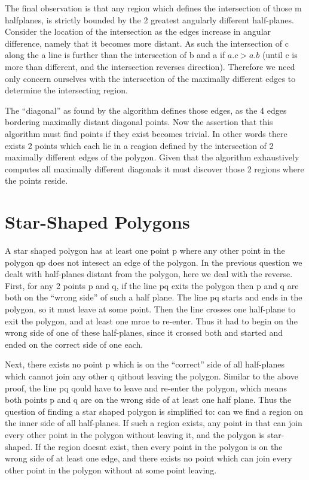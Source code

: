 The final observation is that any region which defines the intersection of those m halfplanes, is strictly bounded by the 2 greatest angularly different half-planes.
Consider the location of the intersection as the edges increase in angular difference, namely that it becomes more distant.
As such the intersection of c along the a line is further than the intersection of b and a if $a.c > a.b$ (until c is more than \pi different, and the intersection reverses direction).
Therefore we need only concern ourselves with the intersection of the maximally different edges to determine the intersecting region.

The ``diagonal'' as found by the algorithm defines those edges, as the 4 edges bordering maximally distant diagonal points.
Now the assertion that this algorithm must find points if they exist becomes trivial.
In other words there exists 2 points which each lie in a reagion defined by the intersection of 2 maximally different edges of the polygon.
Given that the algorithm exhaustively computes all maximally different diagonals it must discover those 2 regions where the points reside.

\section {Star-Shaped Polygons}

A star shaped polygon has at least one point p where any other point in the polygon qp does not intesect an edge of the polygon.
In the previous question we dealt with half-planes distant from the polygon, here we deal with the reverse.
First, for any 2 points p and q, if the line pq exits the polygon then p and q are both on the ``wrong side'' of such a half plane.
The line pq starts and ends in the polygon, so it must leave at some point.
Then the line crosses one half-plane to exit the polygon, and at least one mroe to re-enter.
Thus it had to begin on the wrong side of one of these half-planes, since it crossed both and started and ended on the correct side of one each.

Next, there exists no point p which is on the ``correct'' side of all half-planes which cannot join any other q qithout leaving the polygon.
Similar to the above proof, the line pq qould have to leave and re-enter the polygon, which means both points p and q are on the wrong side of at least one half plane.
Thus the question of finding a star shaped polygon is simplified to: can we find a region on the inner side of all half-planes.
If such a region exists, any point in that can join every other point in the polygon without leaving it, and the polygon is star-shaped.
If the region doesnt exist, then every point in the polygon is on the wrong side of at least one edge, and there exists no point which can join every other point in the polygon without at some point leaving.

